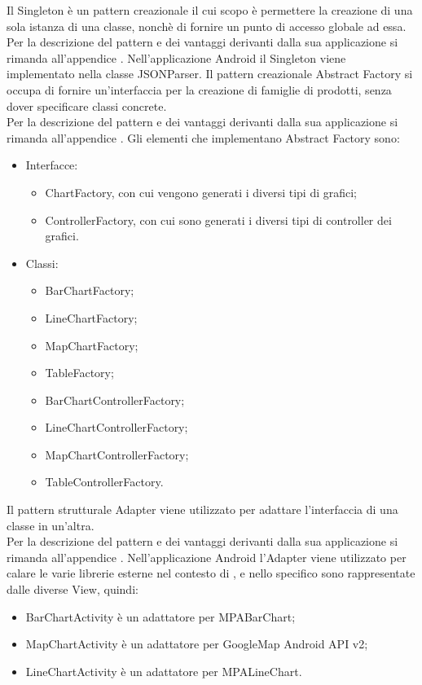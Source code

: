 	Il Singleton è un pattern creazionale il cui scopo è permettere la creazione di una sola istanza di una classe, nonchè di fornire un punto di accesso globale ad essa.\\
	Per la descrizione del pattern e dei vantaggi derivanti dalla sua applicazione si rimanda all'appendice .
	Nell'applicazione Android il Singleton viene implementato nella classe JSONParser.
	Il pattern creazionale Abstract Factory si occupa di fornire un'interfaccia per la creazione di famiglie di prodotti, senza dover specificare classi concrete. \\
	Per la descrizione del pattern e dei vantaggi derivanti dalla sua applicazione si rimanda all'appendice .
	Gli elementi che implementano Abstract Factory sono:
	\begin{itemize}
	\item Interfacce:
		\begin{itemize}
			\item ChartFactory, con cui vengono generati i diversi tipi di grafici;
			\item ControllerFactory, con cui sono generati i diversi tipi di controller dei grafici.
		\end{itemize}
	\item Classi:
		\begin{itemize}
			\item BarChartFactory;
			\item LineChartFactory;
			\item MapChartFactory;
			\item TableFactory;
			\item BarChartControllerFactory;
			\item LineChartControllerFactory;
			\item MapChartControllerFactory;
			\item TableControllerFactory.
		\end{itemize}
	\end{itemize}
	Il pattern strutturale Adapter viene utilizzato per adattare l'interfaccia di una classe in un'altra.\\
	Per la descrizione del pattern e dei vantaggi derivanti dalla sua applicazione si rimanda all'appendice .
	Nell'applicazione Android l'Adapter viene utilizzato per calare le varie librerie esterne nel contesto di \projectname{}, e nello specifico sono rappresentate dalle diverse View, quindi:
	\begin{itemize}
	\item BarChartActivity è un adattatore per MPABarChart;
	\item MapChartActivity è un adattatore per GoogleMap Android API v2;
	\item LineChartActivity è un adattatore per MPALineChart.
	\end{itemize}
	
		
		

